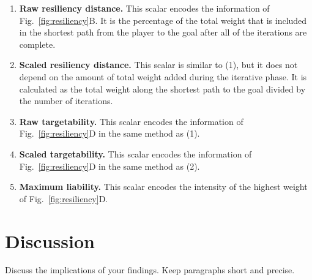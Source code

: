 \documentclass[10pt]{article}
\begin{document}
\begin{enumerate}
    \item \textbf{Raw resiliency distance.} This scalar encodes the information of Fig.~\ref{fig:resiliency}B. It is the percentage of the total weight that is included in the shortest path from the player to the goal after all of the iterations are complete.
    \item \textbf{Scaled resiliency distance.} This scalar is similar to (1), but it does not depend on the amount of total weight added during the iterative phase. It is calculated as the total weight along the shortest path to the goal divided by the number of iterations.
    \item \textbf{Raw targetability.} This scalar encodes the information of Fig.~\ref{fig:resiliency}D in the same method as (1).
    \item \textbf{Scaled targetability.} This scalar encodes the information of Fig.~\ref{fig:resiliency}D in the same method as (2).
    \item \textbf{Maximum liability.} This scalar encodes the intensity of the highest weight of Fig.~\ref{fig:resiliency}D.
\end{enumerate}

\section{Discussion}
Discuss the implications of your findings. Keep paragraphs short and precise.




\end{document}
